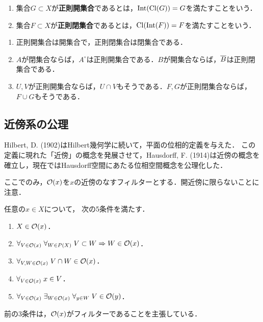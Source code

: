 \documentclass[uplatex,dvipdfmx]{jsreport}
\begin{document}
\begin{definition}\mbox{}
    \begin{enumerate}
        \item 集合$G\subset X$が\textbf{正則開集合}であるとは，$\mathrm{Int}(\mathrm{Cl}(G))=G$を満たすことをいう．
        \item 集合$F\subset X$が\textbf{正則閉集合}であるとは，$\mathrm{Cl}(\mathrm{Int}(F))=F$を満たすことをいう．
    \end{enumerate}
\end{definition}

\begin{proposition}\mbox{}
    \begin{enumerate}
        \item 正則開集合は開集合で，正則閉集合は閉集合である．
        \item $A$が閉集合ならば，$A^\circ$は正則開集合である．$B$が開集合ならば，$\overline{B}$は正則閉集合である．
        \item $U,V$が正則開集合ならば，$U\cap V$もそうである．$F,G$が正則閉集合ならば，$F\cup G$もそうである．
    \end{enumerate}
\end{proposition}

\subsection{近傍系の公理}

\begin{tcolorbox}[colframe=ForestGreen, colback=ForestGreen!10!white,breakable,colbacktitle=ForestGreen!40!white,coltitle=black,fonttitle=\bfseries\sffamily,
title=]
    Hilbert, D. (1902)はHilbert幾何学に続いて，平面の位相的定義を与えた．
    この定義に現れた「近傍」の概念を発展させて，Hausdorff, F. (1914)は近傍の概念を確立し，現在ではHausdorff空間にあたる位相空間概念を公理化した．
\end{tcolorbox}

\begin{notation}
    ここでのみ，$\mathcal{O}(x)$を$x$の近傍のなすフィルターとする．開近傍に限らないことに注意．
\end{notation}

\begin{proposition}
    任意の$x\in X$について，
    次の5条件を満たす．
    \begin{enumerate}
        \item $X\in\mathcal{O}(x)$．
        \item $\forall_{V\in\mathcal{O}(x)}\;\forall_{W\in P(X)}\;V\subset W\Rightarrow W\in\mathcal{O}(x)$．
        \item $\forall_{V,W\in\mathcal{O}(x)}\;V\cap W\in\mathcal{O}(x)$．
        \item $\forall_{V\in\mathcal{O}(x)}\;x\in V$．
        \item $\forall_{V\in\mathcal{O}(x)}\;\exists_{W\in\mathcal{O}(x)}\;\forall_{y\in W}\;V\in\mathcal{O}(y)$．
    \end{enumerate}
    前の3条件は，$\mathcal{O}(x)$がフィルターであることを主張している．
\end{proposition}
\end{document}
